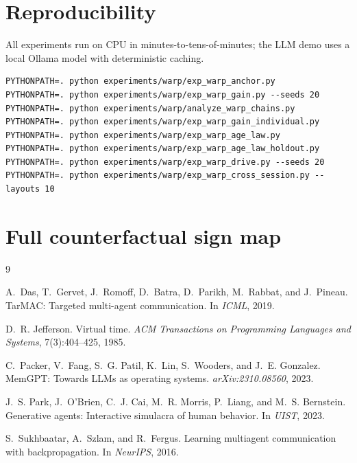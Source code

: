 \documentclass{article}
\begin{document}
\section{Reproducibility}
\label{app:repro}
All experiments run on CPU in minutes-to-tens-of-minutes; the LLM demo
uses a local Ollama model with deterministic caching.
\begin{verbatim}
PYTHONPATH=. python experiments/warp/exp_warp_anchor.py
PYTHONPATH=. python experiments/warp/exp_warp_gain.py --seeds 20
PYTHONPATH=. python experiments/warp/analyze_warp_chains.py
PYTHONPATH=. python experiments/warp/exp_warp_gain_individual.py
PYTHONPATH=. python experiments/warp/exp_warp_age_law.py
PYTHONPATH=. python experiments/warp/exp_warp_age_law_holdout.py
PYTHONPATH=. python experiments/warp/exp_warp_drive.py --seeds 20
PYTHONPATH=. python experiments/warp/exp_warp_cross_session.py --layouts 10
\end{verbatim}

\section{Full counterfactual sign map}
\label{app:signmap}

\begin{thebibliography}{9}

A.~Das, T.~Gervet, J.~Romoff, D.~Batra, D.~Parikh, M.~Rabbat, and
J.~Pineau.
\newblock TarMAC: Targeted multi-agent communication.
\newblock In \emph{ICML}, 2019.

D.~R. Jefferson.
\newblock Virtual time.
\newblock \emph{ACM Transactions on Programming Languages and Systems},
7(3):404--425, 1985.

C.~Packer, V.~Fang, S.~G. Patil, K.~Lin, S.~Wooders, and J.~E.
Gonzalez.
\newblock MemGPT: Towards LLMs as operating systems.
\newblock \emph{arXiv:2310.08560}, 2023.

J.~S. Park, J.~O'Brien, C.~J. Cai, M.~R. Morris, P.~Liang, and M.~S.
Bernstein.
\newblock Generative agents: Interactive simulacra of human behavior.
\newblock In \emph{UIST}, 2023.

S.~Sukhbaatar, A.~Szlam, and R.~Fergus.
\newblock Learning multiagent communication with backpropagation.
\newblock In \emph{NeurIPS}, 2016.

\end{thebibliography}
\end{document}
